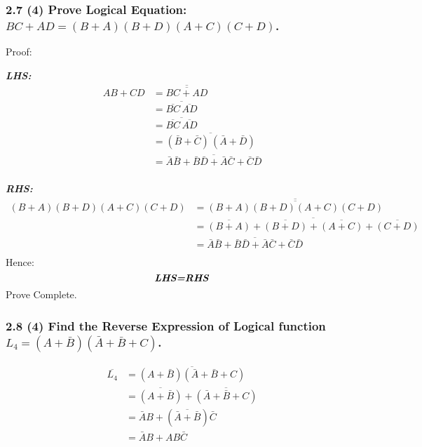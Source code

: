     \subsubsection{2.7 (4) \textnormal{Prove Logical Equation: $BC+AD=(B+A)(B+D)(A+C)(C+D)$}.} 
    {\color{hwSolution}
        \noindent Proof:

        \textbf{\textit{LHS:}}
        \begin{align*}
            AB+CD &= \overline{\overline{BC+AD}}\\
            &= \overline{\overline{BC}\,\overline{AD}}\\
            &= \overline{\overline{BC}\,\overline{AD}}\\
            &= \overline{(\bar{B}+\bar{C})\,(\bar{A}+\bar{D})}\\
            &= \overline{\bar{A}\bar{B}+\bar{B}\bar{D}+\bar{A}\bar{C}+\bar{C}\bar{D}}\\
        \end{align*}

        \textbf{\textit{RHS:}}
        \begin{align*}
            (B+A)(B+D)(A+C)(C+D) &= \overline{\overline{(B+A)(B+D)(A+C)(C+D)}}\\
            &= \overline{\overline{(B+A)}+\overline{(B+D)}+\overline{(A+C)}+\overline{(C+D)}}\\
            &= \overline{\bar{A}\bar{B}+\bar{B}\bar{D}+\bar{A}\bar{C}+\bar{C}\bar{D}}\\
        \end{align*}
        Hence:
        \[\textbf{\textit{LHS=RHS}}\]
        Prove Complete.
    }
    \subsubsection{2.8 (4) \textnormal{Find the Reverse Expression of Logical function $L_4=(A+\bar{B})(\bar{A}+\bar{B}+C)$}.}
    {\color{hwSolution}
        \begin{align*}
            \overline{L_4} 
            &= \overline{(A+\bar{B})(\bar{A}+\bar{B}+C)}\\
            &= \overline{(A+\bar{B})}+\overline{(\bar{A}+\bar{B}+C)}\\
            &= \bar{A}B+(\overline{\bar{A}+\bar{B}})\bar{C}\\
            &= \bar{A}B+AB\bar{C}
        \end{align*}
    }
